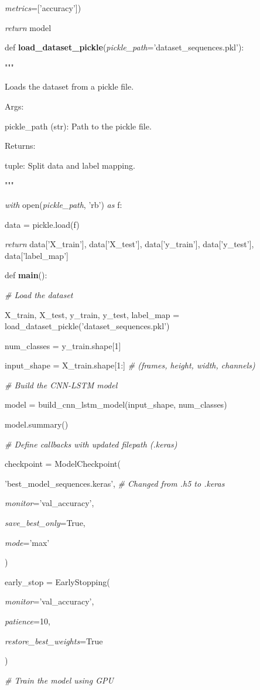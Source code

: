 \documentclass[
]{article}
\begin{document}
\emph{metrics}={[}'accuracy'{]})

\emph{return} model

def \textbf{load\_dataset\_pickle}(\emph{pickle\_path}='dataset\_sequences.pkl'):

"""

Loads the dataset from a pickle file.

Args:

pickle\_path (str): Path to the pickle file.

Returns:

tuple: Split data and label mapping.

"""

\emph{with} open(\emph{pickle\_path}, 'rb') \emph{as} f:

data = pickle.load(f)

\emph{return} data{[}'X\_train'{]}, data{[}'X\_test'{]}, data{[}'y\_train'{]}, data{[}'y\_test'{]}, data{[}'label\_map'{]}

def \textbf{main}():

\emph{\# Load the dataset}

X\_train, X\_test, y\_train, y\_test, label\_map = load\_dataset\_pickle('dataset\_sequences.pkl')

num\_classes = y\_train.shape{[}1{]}

input\_shape = X\_train.shape{[}1:{]} \emph{\# (frames, height, width, channels)}

\emph{\# Build the CNN-LSTM model}

model = build\_cnn\_lstm\_model(input\_shape, num\_classes)

model.summary()

\emph{\# Define callbacks with updated filepath (.keras)}

checkpoint = ModelCheckpoint(

'best\_model\_sequences.keras', \emph{\# Changed from .h5 to .keras}

\emph{monitor}='val\_accuracy',

\emph{save\_best\_only}=True,

\emph{mode}='max'

)

early\_stop = EarlyStopping(

\emph{monitor}='val\_accuracy',

\emph{patience}=10,

\emph{restore\_best\_weights}=True

)

\emph{\# Train the model using GPU}
\end{document}
